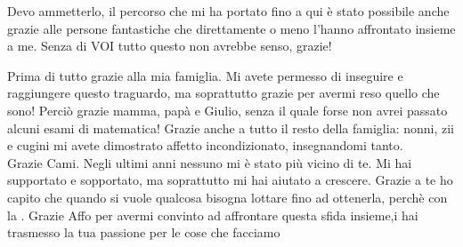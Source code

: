 
Devo ammetterlo, il percorso che mi ha portato fino a qui è stato possibile anche grazie alle persone fantastiche che direttamente o meno l'hanno affrontato insieme a me. Senza di VOI tutto questo non avrebbe senso, grazie!

Prima di tutto grazie alla mia famiglia. Mi avete permesso di inseguire e raggiungere questo traguardo, ma soprattutto grazie per avermi reso quello che sono! Perciò grazie mamma, papà e Giulio, senza il quale forse non avrei passato alcuni esami di matematica! Grazie anche a tutto il resto della famiglia: nonni, zii e cugini mi avete dimostrato affetto incondizionato, insegnandomi tanto.\\
Grazie Cami. Negli ultimi anni nessuno mi è stato più vicino di te. Mi hai supportato e sopportato, ma soprattutto mi hai aiutato a crescere. Grazie a te ho capito che quando si vuole qualcosa bisogna lottare fino ad ottenerla, perchè con la . 
Grazie Affo per avermi convinto ad affrontare questa sfida insieme,i hai trasmesso la tua passione per le cose che facciamo 